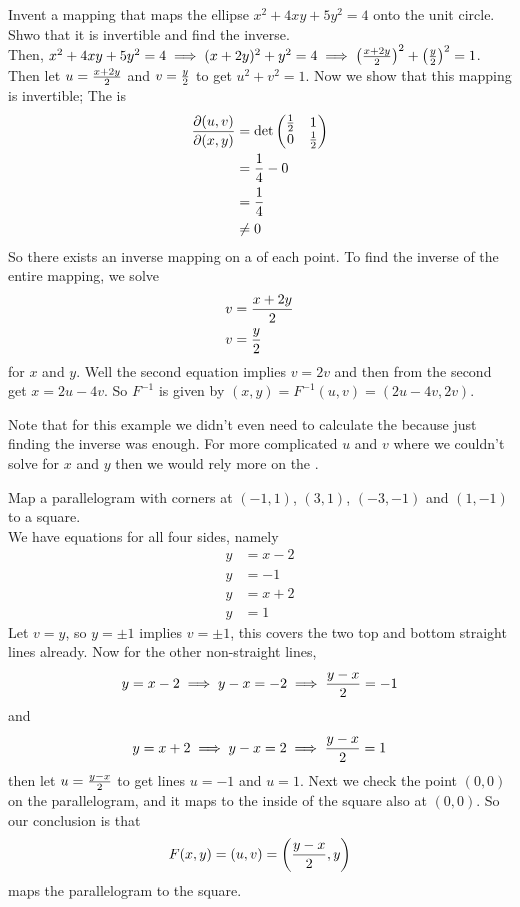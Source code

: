 \documentclass[english, 11pt]{article}
\begin{document}
\begin{exmp}
  Invent a mapping that maps the ellipse $x^2 + 4xy + 5y^2 = 4$ onto the unit circle. Shwo that it is invertible and find the inverse. \\

  Then, $x^2 + 4xy + 5y^2 = 4 \implies (x+2y)^2 + y^2 = 4 \implies \left( \frac{x+2y}{2} \right)^2 + \left( \frac{y}{2} \right)^2 = 1$. Then let $u = \frac{x+2y}{2}$ and $v = \frac{y}{2}$ to get $u^2 + v^2 = 1$. Now we show that this mapping is invertible; The  is
  \begin{align*}
    \frac{\partial(u,v)}{\partial(x,y)} & = \det \left( \begin{matrix} \frac{1}{2} & 1 \\ 0 & \frac{1}{2} \end{matrix} \right) \\
          & = \frac{1}{4} - 0 \\
          & = \frac{1}{4} \\
          & \not = 0
  \end{align*}
  So there exists an inverse mapping on a  of each point. To find the inverse of the entire mapping, we solve
  \begin{align*}
    v & = \frac{x+2y}{2} \\
    v & = \frac{y}{2}
  \end{align*}
  for $x$ and $y$. Well the second equation implies $v = 2v$ and then from the second get $x = 2u - 4v$.  So $F^{-1}$ is given by $(x,y) = F^{-1}(u,v) = (2u - 4v, 2v)$.
\end{exmp}

Note that for this example we didn't even need to calculate the  because just finding the inverse was enough. For more complicated $u$ and $v$ where we couldn't solve for $x$ and $y$ then we would rely more on the .

\begin{exmp}
  Map a parallelogram with corners at $(-1,1)$, $(3,1)$, $(-3,-1)$ and $(1,-1)$ to a square. \\

  We have equations for all four sides, namely
  \begin{align*}
    y & = x - 2 \\
    y & = -1 \\
    y & = x + 2 \\
    y & = 1
  \end{align*}
  Let $v = y$, so $y = \pm 1$ implies $v = \pm 1$, this covers the two top and bottom straight lines already. Now for the other non-straight lines,
  \[ y = x - 2 \implies y - x = -2 \implies \frac{y-x}{2} = -1 \]
  and
  \[ y = x + 2 \implies y - x = 2 \implies \frac{y-x}{2} = 1 \]
  then let $u = \frac{y-x}{2}$ to get lines $u = -1$ and $u = 1$. Next we check the point $(0,0)$ on the parallelogram, and it maps to the inside of the square also at $(0,0)$. So our conclusion is that
  \[ F(x,y) = (u,v) = \left( \frac{y-x}{2}, y \right) \]
  maps the parallelogram to the square.
\end{exmp}
\end{document}

